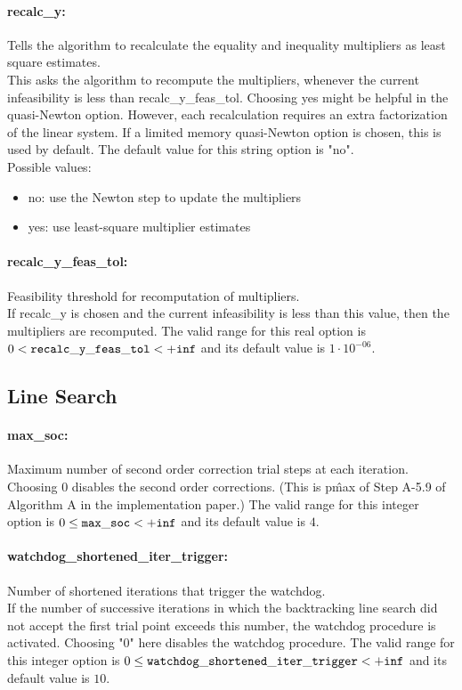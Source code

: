 \paragraph{recalc\_y:}\label{opt:recalc_y} Tells the algorithm to recalculate the equality and inequality multipliers as least square estimates. \\
 This asks the algorithm to recompute the multipliers, whenever the current infeasibility is less than recalc\_y\_feas\_tol. Choosing yes might be helpful in the quasi-Newton option.  However, each recalculation requires an extra factorization of the linear system.  If a limited memory quasi-Newton option is chosen, this is used by default. The default value for this string option is "no".
\\ 
Possible values:
\begin{itemize}
   \item no: use the Newton step to update the multipliers
   \item yes: use least-square multiplier estimates
\end{itemize}

\paragraph{recalc\_y\_feas\_tol:}\label{opt:recalc_y_feas_tol} Feasibility threshold for recomputation of multipliers. \\
 If recalc\_y is chosen and the current infeasibility is less than this value, then the multipliers are recomputed. The valid range for this real option is 
$0 <  {\tt recalc\_y\_feas\_tol } <  {\tt +inf}$
and its default value is $1 \cdot 10^{-06}$.


\subsection{Line Search}

\paragraph{max\_soc:}\label{opt:max_soc} Maximum number of second order correction trial steps at each iteration. \\
 Choosing 0 disables the second order corrections. (This is p\^{max} of Step A-5.9 of Algorithm A in the implementation paper.) The valid range for this integer option is
$0 \le {\tt max\_soc } <  {\tt +inf}$
and its default value is $4$.


\paragraph{watchdog\_shortened\_iter\_trigger:}\label{opt:watchdog_shortened_iter_trigger} Number of shortened iterations that trigger the watchdog. \\
 If the number of successive iterations in which the backtracking line search did not accept the first trial point exceeds this number, the watchdog procedure is activated.  Choosing "0" here disables the watchdog procedure. The valid range for this integer option is
$0 \le {\tt watchdog\_shortened\_iter\_trigger } <  {\tt +inf}$
and its default value is $10$.


